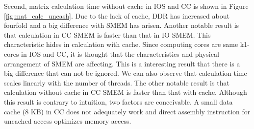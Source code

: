 \documentclass{sig-alternate-05-2015}
\begin{document}
Second, matrix calculation time without cache in IOS and CC is shown in Figure \ref{fig:mat_calc_uncash}.
Due to the lack of cache, DDR has increased about fourfold and a big difference with SMEM has arisen.
Another notable result is that calculation in CC SMEM is faster than that in IO SMEM.
This characteristic hides in calculation with cache.
Since computing cores are same k1-cores in IOS and CC, it is thought that the characteristics and physical arrangement of SMEM are affecting.
This is a interesting result that there is a big difference that can not be ignored.
We can also observe that calculation time scales linearly with the number of threads.
The other notable result is that calculation without cache in CC SMEM is faster than that with cache.
Although this result is contrary to intuition, two factors are conceivable.
A small data cache (8 KB) in CC does not adequately work and direct assembly instruction for uncached access optimizes memory access.
\end{document}
